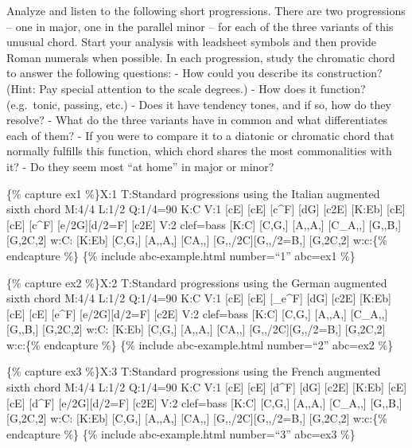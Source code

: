\documentclass{book}
\begin{document}
Analyze and listen to the following short progressions. There are two
progressions -- one in major, one in the parallel minor -- for each of the
three variants of this unusual chord. Start your analysis with leadsheet
symbols and then provide Roman numerals when possible. In each progression,
study the chromatic chord to answer the following questions: - How could you
describe its construction? (Hint: Pay special attention to the scale degrees.)
- How does it function? (e.g.~tonic, passing, etc.) - Does it have tendency
tones, and if so, how do they resolve? - What do the three variants have in
common and what differentiates each of them? - If you were to compare it to a
diatonic or chromatic chord that normally fulfills this function, which chord
shares the most commonalities with it? - Do they seem most ``at home'' in
major or minor?

\{\% capture ex1 \%\}X:1 T:Standard progressions using the Italian augmented
sixth chord M:4/4 L:1/2 Q:1/4=90 K:C V:1 {[}cE{]} {[}cE{]}\textbar{}
{[}c\^{}F{]} {[}dG{]}\textbar{} {[}c2E{]}\textbar{]} {[}K:Eb{]} {[}cE{]}
{[}cE{]}\textbar{} {[}c\^{}F{]} {[}e/2G{]}{[}d/2=F{]}\textbar{}
{[}c2E{]}\textbar{]} V:2 clef=bass {[}K:C{]} {[}C,G,{]} {[}A,,A,{]}\textbar{}
{[}C\_A,,{]} {[}G,,B,{]}\textbar{} {[}G,2C,2{]}\textbar{]} w:C: {[}K:Eb{]}
{[}C,G,{]} {[}A,,A,{]}\textbar{} {[}CA,,{]}
{[}G,,/2C{]}{[}G,,/2=B,{]}\textbar{} {[}G,2C,2{]}\textbar{]} w:c:\{\%
endcapture \%\} \{\% include abc-example.html number=``1'' abc=ex1 \%\}

\{\% capture ex2 \%\}X:2 T:Standard progressions using the German augmented
sixth chord M:4/4 L:1/2 Q:1/4=90 K:C V:1 {[}cE{]} {[}cE{]}\textbar{}
{[}\_e\^{}F{]} {[}dG{]}\textbar{} {[}c2E{]}\textbar{]} {[}K:Eb{]} {[}cE{]}
{[}cE{]}\textbar{} {[}e\^{}F{]} {[}e/2G{]}{[}d/2=F{]}\textbar{}
{[}c2E{]}\textbar{]} V:2 clef=bass {[}K:C{]} {[}C,G,{]} {[}A,,A,{]}\textbar{}
{[}C\_A,,{]} {[}G,,B,{]}\textbar{} {[}G,2C,2{]}\textbar{]} w:C: {[}K:Eb{]}
{[}C,G,{]} {[}A,,A,{]}\textbar{} {[}CA,,{]}
{[}G,,/2C{]}{[}G,,/2=B,{]}\textbar{} {[}G,2C,2{]}\textbar{]} w:c:\{\%
endcapture \%\} \{\% include abc-example.html number=``2'' abc=ex2 \%\}

\{\% capture ex3 \%\}X:3 T:Standard progressions using the French augmented
sixth chord M:4/4 L:1/2 Q:1/4=90 K:C V:1 {[}cE{]} {[}cE{]}\textbar{}
{[}d\^{}F{]} {[}dG{]}\textbar{} {[}c2E{]}\textbar{]} {[}K:Eb{]} {[}cE{]}
{[}cE{]}\textbar{} {[}d\^{}F{]} {[}e/2G{]}{[}d/2=F{]}\textbar{}
{[}c2E{]}\textbar{]} V:2 clef=bass {[}K:C{]} {[}C,G,{]} {[}A,,A,{]}\textbar{}
{[}C\_A,,{]} {[}G,,B,{]}\textbar{} {[}G,2C,2{]}\textbar{]} w:C: {[}K:Eb{]}
{[}C,G,{]} {[}A,,A,{]}\textbar{} {[}CA,,{]}
{[}G,,/2C{]}{[}G,,/2=B,{]}\textbar{} {[}G,2C,2{]}\textbar{]} w:c:\{\%
endcapture \%\} \{\% include abc-example.html number=``3'' abc=ex3 \%\}
\end{document}
